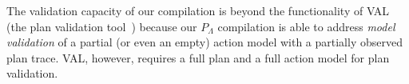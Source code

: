 The validation capacity of our compilation is beyond the functionality of VAL (the plan validation tool~\cite{howey2004val}) because our $P_{\Lambda}$ compilation is able to address {\em model validation} of a partial (or even an empty) action model with a partially observed plan trace. VAL, however, requires a full plan and a full action model for plan validation.